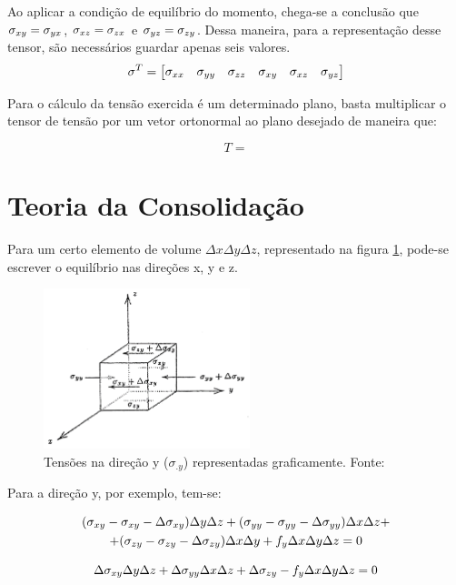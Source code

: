Ao aplicar a condição de equilíbrio do momento, chega-se a conclusão que $\sigma_{xy}=\sigma_{yx}$, $\sigma_{xz}=\sigma_{zx}$ e $\sigma_{yz}=\sigma_{zy}$. Dessa maneira, para a representação desse tensor, são necessários guardar apenas seis valores.
\begin{equation}
\label{eq:tensor6}
\sigma^T = \begin{bmatrix}
\sigma_{xx} & \sigma_{yy} & \sigma_{zz} & \sigma_{xy} & \sigma_{xz} & \sigma_{yz}
\end{bmatrix}
\end{equation}

Para o cálculo da tensão exercida é um determinado plano, basta multiplicar o tensor de tensão por um vetor ortonormal ao plano desejado de maneira que:

\begin{equation}
T = 
\end{equation}


\section{Teoria da Consolidação}

Para um certo elemento de volume $\Delta x\Delta y \Delta z$, representado na figura \ref{fig:equilibrio}, pode-se escrever o equilíbrio nas direções x, y e z.

\begin{figure}[!htbp]
\label{fig:equilibrio}
\centering
\includegraphics[width=6cm]{chap01/equilibrio.png}
\caption{Tensões na direção y ($\sigma_{.y}$) representadas graficamente.  Fonte: \cite{CompGeomec}}
\end{figure}

Para a direção y, por exemplo, tem-se:

\begin{multline}
   (\sigma_{xy} - \sigma_{xy} - \Delta \sigma_{xy}) \Delta y\Delta z + (\sigma_{yy} - \sigma_{yy} - \Delta \sigma_{yy})\Delta x\Delta z  +\\
   + (\sigma_{zy} - \sigma_{zy} - \Delta\sigma_{zy}) \Delta x\Delta y + f_y\Delta x\Delta y\Delta z = 0 
\end{multline}

\begin{equation}
 \Delta \sigma_{xy} \Delta y\Delta z + \Delta \sigma_{yy}\Delta x\Delta z + \Delta\sigma_{zy} - f_y\Delta x\Delta y\Delta z = 0
\end{equation}

